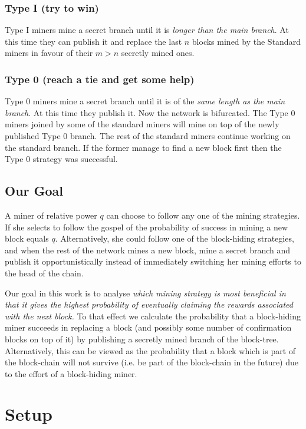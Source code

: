 \documentclass[letterpaper,12pt]{report}
\begin{document}
\subsection{Type I (try to win)}
Type I miners mine a secret branch until it is \textit{longer than the main branch}. At this time they can publish it and replace the last $n$ blocks mined by the Standard miners in favour of their $m>n$ secretly mined ones.

\subsection{Type 0 (reach a tie and get some help)}
Type 0 miners mine a secret branch until it is of the  \textit{same length as the main branch}. At this time they publish it. Now the network is bifurcated. The Type 0 miners joined by some of the standard miners will mine on top of the newly published Type 0 branch. The rest of the standard miners continue working on the standard branch. If the former manage to find a new block first then the Type 0 strategy was successful. 

\section{Our Goal}\label{subsec:goal}

A miner of relative power $q$ can choose to follow any one of the mining strategies. If she selects to follow the gospel of \cite{Bitcoin} the probability of success in mining a new block equals $q$. Alternatively, she could follow one of the block-hiding strategies, and when the rest of the network mines a new block, mine a secret branch and publish it opportunistically instead of immediately switching her mining efforts to the head of the chain.  

Our goal in this work is to analyse \textit{which mining strategy is most beneficial in that it gives the highest probability of eventually claiming the rewards associated with the next block.} 
To that effect we calculate the probability that a block-hiding miner succeeds in replacing a block (and possibly some number of confirmation blocks on top of it) by publishing a secretly mined branch of the block-tree. Alternatively, this can be viewed as the probability that a block which is part of the block-chain will not survive (i.e. be part of the block-chain in the future) due to the effort of a block-hiding miner.

\chapter{Setup}\label{chap:calc}
\end{document}
